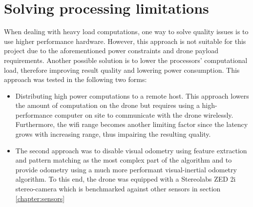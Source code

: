 \section{Solving processing limitations}
When dealing with heavy load computations, one way to solve quality issues is to use higher performance hardware. However, this approach is not suitable for this project due to the aforementioned power constraints and drone payload requirements. 
Another possible solution is to lower the processors' computational load, therefore improving result quality and lowering power consumption. 
This approach was tested in the following two forms:
\begin{itemize}
	
	\item Distributing high power computations to a remote host. This approach lowers the amount of computation on the drone but requires using a high-performance computer on site to communicate with the drone wirelessly. Furthermore, the wifi range becomes another limiting factor since the latency grows with increasing range, thus impairing the resulting quality.
	
	\item The second approach was to disable visual odometry using feature extraction and pattern matching as the most complex part of the algorithm and to provide odometry using a much more performant visual-inertial odometry algorithm. To this end, the drone was equipped with a Stereolabs ZED 2i stereo-camera which is benchmarked against other sensors in section \ref{chapter:sensors}%
\end{itemize}

